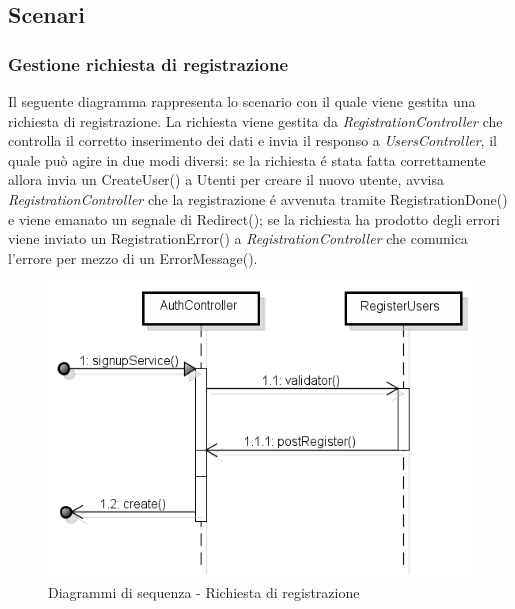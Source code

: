 \subsection{Scenari}
\subsubsection{Gestione richiesta di registrazione}
Il seguente diagramma rappresenta lo scenario con il quale viene gestita una richiesta di registrazione. La richiesta viene gestita da \textit{RegistrationController} che controlla il corretto inserimento dei dati e invia il responso a \textit{UsersController}, il quale può agire in due modi diversi: se la richiesta é stata fatta correttamente allora invia un CreateUser() a Utenti per creare il nuovo utente, avvisa \textit{RegistrationController} che la registrazione é avvenuta tramite RegistrationDone() e viene emanato un segnale di Redirect(); se la richiesta ha prodotto degli errori viene inviato un RegistrationError() a \textit{RegistrationController} che comunica l'errore per mezzo di un ErrorMessage().
\begin{figure}[h]
	\centering
	\includegraphics[scale=0.5]{img/register.png}
	\caption{Diagrammi di sequenza - Richiesta di registrazione}
\end{figure}

